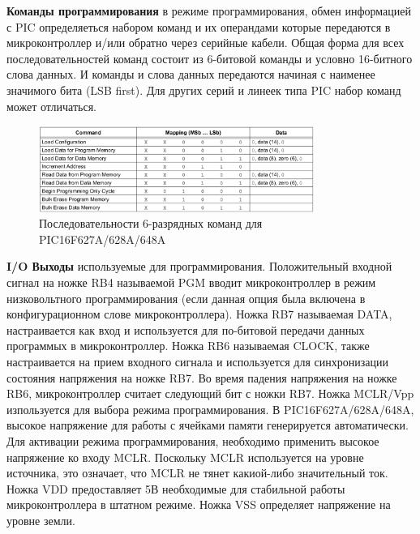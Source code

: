 \textbf{Команды программирования} 
в режиме программирования, обмен информацией с PIC определяеться набором команд и 
их операндами которые передаются в микроконтроллер и/или обратно через серийные кабели. 
Общая форма для всех последовательностей команд
состоит из 6-битовой команды и условно 16-битного
слова данных. И команды и слова данных передаются начиная с наименее значимого бита (LSB first).
Для других серий и линеек типа PIC набор команд может отличаться.

\begin{figure}[h!]
    \centering
    \includegraphics[width=0.8\textwidth]{2017-05-08_at_03:31:35_screenshot.png}
    \caption{Последовательности 6-разрядных команд для PIC16F627A/628A/648A}
\end{figure}

\textbf{I/O Выходы} используемые для программирования. Положительный входной сигнал на ножке RB4 называемой PGM вводит микроконтроллер в режим низковольтного программирования (если данная опция была включена в конфигурационном слове микроконтроллера). Ножка RB7 называемая DATA, настраивается как вход и используется для по-битовой передачи данных программых в микроконтроллер. Ножка RB6 называемая CLOCK, также настраивается на прием входного сигнала и используется для синхронизации состояния напряжения на ножке RB7. Во время падения напряжения на ножке RB6, микроконтроллер считает следующий бит с ножки RB7. Ножка MCLR/Vpp изпользуется для выбора режима программирования. В PIC16F627A/628A/648A, высокое напряжение для работы с ячейками памяти генерируется автоматически. Для активации
режима программирования, необходимо применить высокое напряжение ко входу MCLR. Поскольку MCLR используется на уровне источника, это означает, что MCLR не тянет какиой-либо значительный ток. Ножка VDD предоставляет 5В необходимые для стабильной работы микроконтроллера в штатном режиме. Ножка VSS определяет напряжение на уровне земли.

